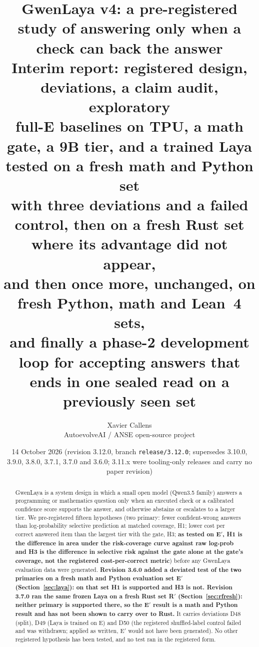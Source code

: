 \documentclass[11pt,a4paper]{article}
\title{GwenLaya v4: a pre-registered study of answering only when a check can back the answer\\[4pt]
\large Interim report: registered design, deviations, a claim audit, exploratory\\
full-E baselines on TPU, a math gate, a 9B tier, and a trained Laya tested on a fresh math and Python set\\ with three deviations and a failed control, then on a fresh Rust set where its advantage did not appear,\\ and then once more, unchanged, on fresh Python, math and Lean~4 sets,\\ and finally a phase-2 development loop for accepting answers that ends in one sealed read on a previously seen set}
\author{Xavier Callens\\AutoevolveAI / ANSE open-source project}
\date{14 October 2026 \quad (revision 3.12.0, branch \texttt{release/3.12.0}; supersedes 3.10.0, 3.9.0, 3.8.0, 3.7.1, 3.7.0 and 3.6.0; 3.11.x were tooling-only releases and carry no paper revision)}
\begin{document}
\maketitle

\begin{abstract}
GwenLaya is a system design in which a small open model (Qwen3.5 family) answers a programming or
mathematics question only when an executed check or a calibrated confidence score supports the
answer, and otherwise abstains or escalates to a larger tier. We pre-registered fifteen hypotheses
(two primary: fewer confident-wrong answers than log-probability selective prediction at matched
coverage, H1; lower cost per correct answered item than the largest tier with the gate, H3; \textbf{as tested on E$'$, H1 is the difference in area under the risk-coverage curve against raw log-prob and H3 is the difference in selective risk against the gate alone at the gate's coverage, not the registered cost-per-correct metric}) before
any GwenLaya evaluation data were generated. \textbf{Revision 3.6.0 added a deviated test of the two
primaries on a fresh math and Python evaluation set E$'$ (Section~\ref{sec:laya}): on that set H1 is supported and H3 is not. Revision 3.7.0 ran the same frozen Laya on a
fresh Rust set R$'$ (Section~\ref{sec:rfresh}): neither primary is supported there, so the E$'$ result is a math and Python result and has not been shown to carry over to Rust.}
It carries deviations D48 (split), D49 (Laya is trained on E) and D50 (the registered shuffled-label control failed
and was withdrawn; applied as written, E$'$ would not have been generated). No other registered hypothesis has been tested, and no test
ran in the registered form.


\end{abstract}
\end{document}
